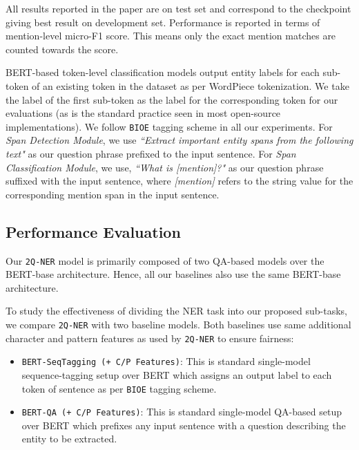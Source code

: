 All results reported in the paper are on test set and correspond to the checkpoint giving best result on development set. Performance is reported in terms of mention-level micro-F1 score. This means only the exact mention matches are counted towards the score.

BERT-based token-level classification models output entity labels for each sub-token of an existing token in the dataset as per WordPiece tokenization. We take the label of the first sub-token as the label for the corresponding token for our evaluations (as is the standard practice seen in most open-source implementations). We follow \texttt{BIOE} tagging scheme in all our experiments. For \textit{Span Detection Module}, we use \textit{``Extract important entity spans from the following text"} as our question phrase prefixed to the input sentence. For \textit{Span Classification Module}, we use, \textit{``What is [mention]?"} as our question phrase suffixed with the input sentence, where \textit{[mention]} refers to the string value for the corresponding mention span in the input sentence. 


\subsection{Performance Evaluation}

Our \texttt{2Q-NER} model is primarily composed of two QA-based models over the BERT-base architecture. Hence, all our baselines also use the same BERT-base architecture. 

To study the effectiveness of dividing the NER task into our proposed sub-tasks, we compare \texttt{2Q-NER} with two baseline models. Both baselines use same additional character and pattern features as used by \texttt{2Q-NER} to ensure fairness:

\begin{itemize}
    \item \texttt{BERT-SeqTagging (+ C/P Features)}: This is standard single-model sequence-tagging setup over BERT which assigns an output label to each token of sentence as per \texttt{BIOE} tagging scheme.
    
    \item \texttt{BERT-QA (+ C/P Features)}: This is standard single-model QA-based setup over BERT which prefixes any input sentence with a question describing the entity to be extracted.
\end{itemize}

